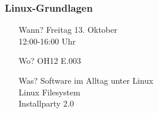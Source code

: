 \documentclass[12pt,utf8]{beamer}
\begin{document}
	\begin{frame}
		\frametitle{Linux-Grundlagen}
		\begin{itemize}
			\item [Wann?]Freitag 13. Oktober\\12:00-16:00 Uhr\newline
			\item [Wo?]OH12 E.003\newline
			\item [Was?]Software im Alltag unter Linux\\Linux Filesystem\\Installparty 2.0
		\end{itemize}
	\end{frame}
\end{document}
